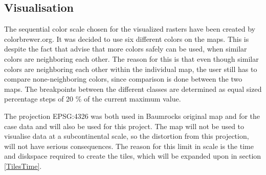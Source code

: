 
\subsection{Visualisation}
The sequential color scale chosen for the visualized rasters have been created by colorbrewer.org. It was decided to use six different colors on the maps. This is despite the fact that \citet{ColorBrewerwebsite} advise that more colors safely can be used, when similar colors are neighboring each other. The reason for this is that even though similar colors are neighboring each other within the individual map, the user still has to compare none-neighboring colors, since comparison is done between the two maps. 
The breakpoints between the different classes are determined as equal sized percentage steps of 20 \% of the current maximum value.  

The projection EPSG:4326 was both used in Baumrocks original map and for the case data and will also be used for this project. The map will not be used to visualise data at a subcontinental scale, so the distortion from this projection, will not have serious consequences. The reason for this limit in scale is the time and diskspace required to create the tiles, which will be expanded upon in section \ref{TilesTime}.
